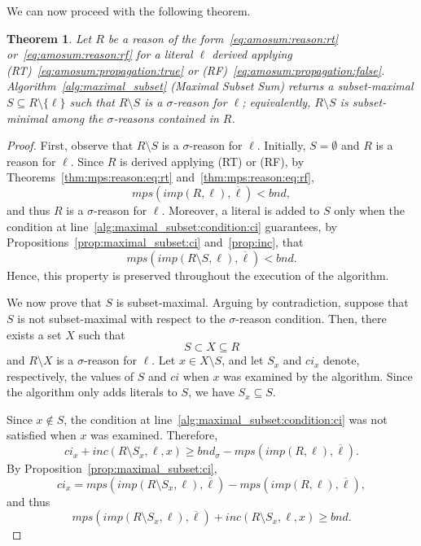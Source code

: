 \documentclass[preprint,authoryear]{elsarticle}
\newcommand{\inc}{\mathit{inc}}
\newcommand{\mps}{\mathit{mps}}
\newcommand{\bnd}{\mathit{bnd}}
\newtheorem{theorem}{Theorem}[section]
\theoremstyle{definition}
\begin{document}
{We can now proceed with the following theorem. 

\begin{theorem}
\label{thm:mss}
    Let $R$ be a reason of the form~\eqref{eq:amosum:reason:rt} or~\eqref{eq:amosum:reason:rf} for a literal $\ell$ derived applying (RT)~\eqref{eq:amosum:propagation:true} or (RF)~\eqref{eq:amosum:propagation:false}. Algorithm~\ref{alg:maximal_subset} (Maximal Subset Sum) returns a subset-maximal $S \subseteq R \setminus \{\ell\} $ such that $R \setminus S$ is a $\sigma$-reason for $\ell$; equivalently, $R\setminus S$ is subset-minimal among the $\sigma$-reasons contained in $R$.
\end{theorem}


\begin{proof}
    First, observe that \(R\setminus S\) is a $\sigma$-reason for \(\ell\). Initially, \(S=\emptyset\) and \(R\) is a reason for \(\ell\).
     Since $R$ is derived applying (RT) or (RF), by Theorems~\ref{thm:mps:reason:eq:rt} and~\ref{thm:mps:reason:eq:rf},
    $$
    \mps(\mathit{imp}(R, \ell), \overline{\ell}) < \bnd,
    $$
    and thus $R$ is a $\sigma$-reason for $\ell$.
Moreover, a literal is added to \(S\) only when the condition at line~\ref{alg:maximal_subset:condition:ci} guarantees, by Propositions~\ref{prop:maximal_subset:ci} and~\ref{prop:inc}, that
\[
\mps(\mathit{imp}(R\setminus S,\ell),\overline{\ell})<\bnd.
\]
Hence, this property is preserved throughout the execution of the algorithm.

We now prove that \(S\) is subset-maximal. Arguing by contradiction, suppose that $S$ is not subset-maximal with respect to the $\sigma$-reason condition. Then, there exists a set $X$ such that
$$
S\subset X\subseteq R
$$
and \(R\setminus X\) is a $\sigma$-reason for \(\ell\). Let \(x\in X\setminus S\), and let \(S_x\) and \(\mathit{ci}_x\) denote, respectively, the values of \(S\) and \(\mathit{ci}\) when \(x\) was examined by the algorithm. Since the algorithm only adds literals to \(S\), we have \(S_x\subseteq S\).

Since \(x\notin S\), the condition at line~\ref{alg:maximal_subset:condition:ci} was not satisfied when \(x\) was examined. Therefore,
\[
\mathit{ci}_x+\inc(R\setminus S_x,\ell,x)
\geq
\bnd_\sigma-\mps(\mathit{imp}(R,\ell),\overline{\ell}).
\]
By Proposition~\ref{prop:maximal_subset:ci},
\[
\mathit{ci}_x=
\mps(\mathit{imp}(R\setminus S_x,\ell),\overline{\ell})
-\mps(\mathit{imp}(R,\ell),\overline{\ell}),
\]
and thus
\[
\mps(\mathit{imp}(R\setminus S_x,\ell),\overline{\ell})
+\inc(R\setminus S_x,\ell,x)
\geq \bnd.
\]


\end{proof}}
\end{document}
